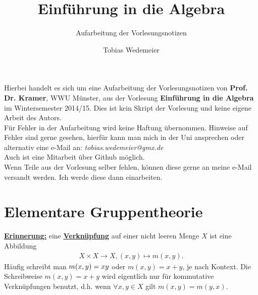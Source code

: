 \documentclass[a4paper, pagesize=pdftex, pdftex, twoside, headsepline, index=totoc,toc=listof, fontsize=10pt, cleardoublepage=empty, headinclude, DIV=13, BCOR=13mm]{scrartcl}
\author{Tobias Wedemeier}
\title{Einführung in die Algebra}
\subtitle{Aufarbeitung der Vorlesungsnotizen}
\newcommand{\bet}[1]{\uline{\textbf{#1}}} %
\newcommand{\Index}[1]{\uline{\textbf{#1}}\index{#1}} %
\begin{document}
\maketitle
\thispagestyle{empty}
\newpage

\thispagestyle{empty}
\vspace*{\fill}
\begin{center}
	Hierbei handelt es sich um eine Aufarbeitung der Vorlesungsnotizen von \textbf{Prof. Dr. Kramer}, WWU Münster, aus der Vorlesung \textbf{Einführung in die Algebra} im Wintersemester 2014/15. Dies ist kein Skript der Vorlesung und keine eigene Arbeit des Autors.\\
	\vspace{2cm}
	Für Fehler in der Aufarbeitung wird keine Haftung übernommen. Hinweise auf Fehler sind gerne gesehen, hierfür kann man mich in der Uni ansprechen oder alternativ eine e-Mail an: \textit{tobias.wedemeier@gmx.de}\\
	Auch ist eine Mitarbeit über Github möglich.\\
	\vspace{2cm}
	Wenn Teile aus der Vorlesung selber fehlen, können diese gerne an meine e-Mail versandt werden. Ich werde diese dann einarbeiten.
\end{center}
\vspace*{\fill}
\newpage


\tableofcontents
\cleardoubleoddemptypage %

\setcounter{page}{1}

\section{Elementare Gruppentheorie}
\label{sec:elementare_gruppentheorie}

\bet{Erinnerung:} eine \Index{Verknüpfung} auf einer nicht leeren Menge $X$ ist eine Abbildung
\begin{equation*}
\begin{aligned}
X\times X \to X , (x,y) \mapsto m(x,y).
\end{aligned}
\end{equation*}
Häufig schreibt man $m(x,y)= x \* y$ oder $ m(x,y) = x + y$, je nach Kontext. Die Schreibweise $m(x,y)=x+y$ wird eigentlich nur für kommutative Verknüpfungen benutzt, d.h. wenn $\forall x,y\in X$ gilt $m(x,y)=m(y,x)$.
\end{document}
